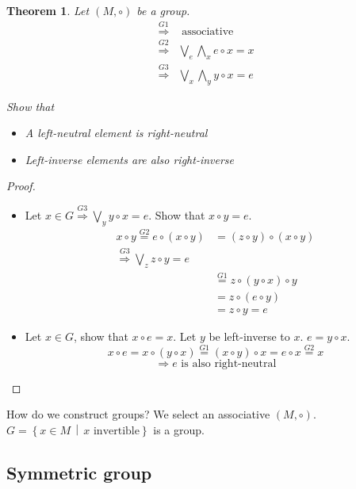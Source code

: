 \documentclass[a4paper,landscape,twocolumn]{article}
\newcommand\setdef[2]{\left\{#1\,\middle|\,#2\right\}}
\newtheorem{theorem}{Theorem}[section]
\begin{document}
\begin{theorem}
  \label{satz-2-9}
  Let $(M,\circ)$ be a group.
  \begin{align*}
    \stackrel{G1}{\Rightarrow} & \text{ associative } \\
    \stackrel{G2}{\Rightarrow} & \bigvee_e \bigwedge_x e \circ x = x \\
    \stackrel{G3}{\Rightarrow} & \bigvee_x \bigwedge_y y \circ x = e
  \end{align*}

  Show that
  \begin{itemize}
      \item[i.] A left-neutral element is right-neutral
      \item[ii.] Left-inverse elements are also right-inverse
  \end{itemize}
\end{theorem}

\begin{proof}
  \begin{itemize}
    \item[ii.]
      Let $x \in G \stackrel{G3}{\Rightarrow} \bigvee_y y \circ x = e$.
      Show that $x \circ y = e$.
      \begin{align*}
        x \circ y \stackrel{G2}{=} e \circ (x \circ y) &= (z \circ y) \circ (x \circ y) \\
        \stackrel{G3}{\Rightarrow} \bigvee_{z} z \circ y = e \\
        &\stackrel{G1}{=} z \circ (y \circ x) \circ y \\
        &= z \circ (e \circ y) \\
        &= z \circ y = e
      \end{align*}
    \item[i.]
      Let $x \in G$, show that $x \circ e = x$. Let $y$ be left-inverse to $x$.
      $e = y \circ x$.
      \[ x \circ e = x \circ (y \circ x) \stackrel{G1}{=} (x \circ y) \circ x = e \circ x \stackrel{G2}{=} x \]
      \[ \Rightarrow e \text{ is also right-neutral} \]
  \end{itemize}
\end{proof}

How do we construct groups? We select an associative $(M, \circ)$.
$G = \setdef{x \in M}{x \text{ invertible}}$ is a group.

\subsection{Symmetric group}
\end{document}
